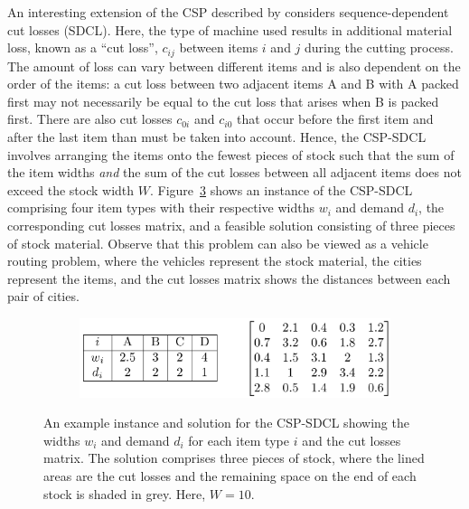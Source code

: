 \documentclass[a4paper,11pt]{article}
\begin{document}
An interesting extension of the CSP described by \citet{garraffa2016} considers sequence-dependent cut losses (SDCL). Here, the type of machine used results in additional material loss, known as a ``cut loss'', $c_{ij}$ between items $i$ and $j$ during the cutting process. The amount of loss can vary between different items and is also dependent on the order of the items: a cut loss between two adjacent items A and B with A packed first may not necessarily be equal to the cut loss that arises when B is packed first. There are also cut losses $c_{0i}$ and $c_{i0}$ that occur before the first item and after the last item than must be taken into account. Hence, the CSP-SDCL involves arranging the items onto the fewest pieces of stock such that the sum of the item widths \emph{and} the sum of the cut losses between all adjacent items does not exceed the stock width $W$. Figure~\ref{fig:cspsdcl} shows an instance of the CSP-SDCL comprising four item types with their respective widths $w_i$ and demand $d_i$, the corresponding cut losses matrix, and a feasible solution consisting of three pieces of stock material. Observe that this problem can also be viewed as a vehicle routing problem, where the vehicles represent the stock material, the cities represent the items, and the cut losses matrix shows the distances between each pair of cities.
\begin{figure}[h!]
	\centering	
	\begin{subfigure}[h]{0.6\textwidth}
		\centering
		\includegraphics[width=\textwidth]{figures/sdcl5}
		\label{fig:sdcldemand}
	\end{subfigure} %
	\begin{subfigure}[h]{0.6\textwidth}
		\centering
		
		\label{fig:sdcl}
	\end{subfigure}	
	\caption{An example instance and solution for the CSP-SDCL showing the widths $w_i$ and demand $d_i$ for each item type $i$ and the cut losses matrix. The solution comprises three pieces of stock, where the lined areas are the cut losses and the remaining space on the end of each stock is shaded in grey. Here, $W = 10$.}	
	\label{fig:cspsdcl}
\end{figure}
\end{document}
